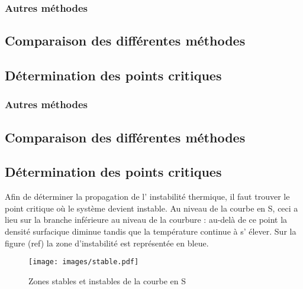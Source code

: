 \subsubsection{Autres méthodes}

\subsection{Comparaison des différentes méthodes}

\subsection{Détermination des points critiques}
\subsubsection{Autres méthodes}

\subsection{Comparaison des différentes méthodes}

\subsection{Détermination des points critiques}
Afin de déterminer la propagation de l' instabilité thermique, il faut trouver le point critique où le système devient instable. Au niveau de la courbe en S, ceci a lieu sur la branche inférieure au niveau de la courbure : au-delà de ce point la densité surfacique diminue tandis que la température continue à s' élever. Sur la figure (ref) la zone d'instabilité est représentée en bleue.

\begin{figure}[htb!]
	\centering
	\texttt{[image: images/stable.pdf]}
	\caption{Zones stables et instables de la courbe en S}
	\label{Fig::bench}
\end{figure}
\FloatBarrier

